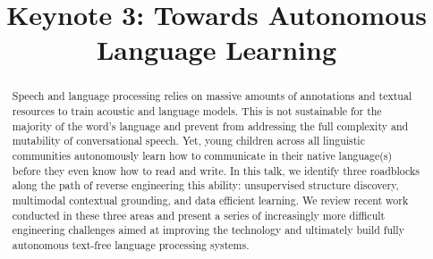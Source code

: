 \documentclass{article}
\title{Keynote 3: Towards Autonomous Language Learning}
\begin{document}
\maketitle
\thispagestyle{empty}
\begin{abstract}
Speech and language processing relies on massive amounts of annotations and textual resources to train acoustic and language models. This is not sustainable for the majority of the word's language and prevent from addressing the full complexity and mutability of conversational speech. Yet, young children across all linguistic communities autonomously learn how to communicate in their native language(s) before they even know how to read and write. In this talk, we identify three roadblocks along the path of reverse engineering this ability: unsupervised structure discovery, multimodal contextual grounding, and data efficient learning. We review recent work conducted in these three areas and present a series of increasingly more difficult engineering challenges aimed at improving the technology and ultimately build fully autonomous text-free language processing systems.
\end{abstract}
\vfill{}
\end{document}
